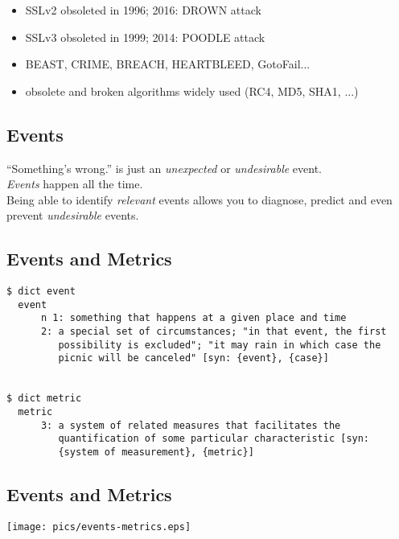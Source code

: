 \documentclass[xga]{xdvislides}
\begin{document}
\begin{itemize}
	\item SSLv2 obsoleted in 1996; 2016: DROWN attack
	\item SSLv3 obsoleted in 1999; 2014: POODLE attack
	\item BEAST, CRIME, BREACH, HEARTBLEED, GotoFail...
	\item obsolete and broken algorithms widely used (RC4, MD5, SHA1, ...)
\end{itemize}

\subsection{Events}
\vspace*{\fill}
\Huge
\begin{center}
``Something's wrong.'' is just an {\em unexpected} or
{\em undesirable} event. \\
\vspace{.4in}
{\em Events} happen all the time. \\
\vspace{.4in}
Being able to identify {\em relevant} events allows
you to diagnose, predict and even prevent {\em
undesirable} events.
\end{center}
\Normalsize
\vspace*{\fill}

\subsection{Events and Metrics}
\vspace*{\fill}
\begin{verbatim}
$ dict event
  event
      n 1: something that happens at a given place and time
      2: a special set of circumstances; "in that event, the first
         possibility is excluded"; "it may rain in which case the
         picnic will be canceled" [syn: {event}, {case}]


$ dict metric
  metric
      3: a system of related measures that facilitates the
         quantification of some particular characteristic [syn:
         {system of measurement}, {metric}]

\end{verbatim}
\vspace*{\fill}

\subsection{Events and Metrics}
\begin{center}
	\texttt{[image: pics/events-metrics.eps]}
\end{center}
\end{document}
